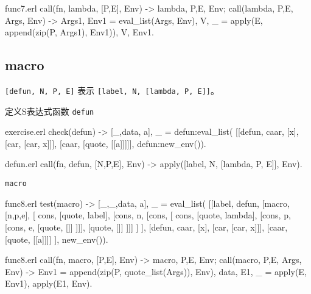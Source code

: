 \documentclass[preview,multi,crop=false,border=1in,class=memoir]{standalone}
\begin{document}
\begin{preview-page}
\begin{SourceCode}[54][59]{func7.erl}
call({fn, lambda}, [P,E], Env) ->
    {{lambda, {P,E}}, Env};
call({lambda, {P,E}}, Args, Env) ->
    {Args1, Env1} = eval_list(Args, Env),
    {V, _} = apply(E, append(zip(P, Args1), Env1)),
    {V, Env1}.
\end{SourceCode}


\subsection{macro}

\begin{Exercise}[title={defun},difficulty=1]
\verb|[defun, N, P, E]| 表示 \verb|[label, N, [lambda, P, E]]|\cite{Graham:2001:roots}。

定义S表达式函数 \verb|defun|

\begin{SourceCode}[27][31]{exercise.erl}
check(defun) ->
    {[_,{data, a}], _} =
        defun:eval_list(
          [[defun, caar, [x], [car, [car, x]]],
           [caar, [quote, [[a]]]]], defun:new_env()).
\end{SourceCode}

\end{Exercise}

\begin{Answer}
\begin{SourceCode}[60][61]{defun.erl}
call({fn, defun}, [N,P,E], Env) ->
    apply([label, N, [lambda, P, E]], Env).
\end{SourceCode}
\end{Answer}

\verb|macro|

\begin{SourceCode}[217][235]{func8.erl}
test(macro) ->
    {[_,_,{data, a}], _} =
        eval_list(
          [[label, defun,
            [macro, [n,p,e],
             [ cons, [quote, label],
              [cons, n,
              [cons, [ cons, [quote, lambda],
                      [cons, p,
                      [cons, e,
                             [quote, []]
                      ]]],
                     [quote, []]
              ]]]
            ]
           ],
           [defun, caar, [x], [car, [car, x]]],
           [caar, [quote, [[a]]]]
          ], new_env()).
\end{SourceCode}


\begin{SourceCode}[60][65]{func8.erl}
call({fn, macro}, [P,E], Env) ->
    {{macro, {P,E}}, Env};
call({macro, {P,E}}, Args, Env) ->
    Env1 = append(zip(P, quote_list(Args)), Env),
    {{data, E1}, _} = apply(E, Env1),
    apply(E1, Env).
\end{SourceCode}


\end{preview-page}
\end{document}
